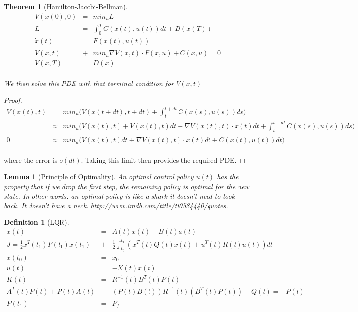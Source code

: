 \documentclass[a4paper,landscape]{article}
\theoremstyle{change}
\newtheorem{definition}[equation]{Definition}
\newtheorem{thm}[equation]{Theorem}
\newtheorem{lemma}[equation]{Lemma}
\theoremstyle{nonumberplain}
\newtheorem{proof}{Proof}
\numberwithin{equation}{section}
\begin{document}
\begin{thm}[Hamilton-Jacobi-Bellman]
\begin{eqnarray*}
V ( x(0) , 0 ) &=& min_u L\\
L &=& \int_0^T C ( x(t), u(t)) dt + D(x(T))\\
\dot{x} (t) &=& F ( x(t), u(t) )\\
\dot{V} (x ,t ) &+& min_u \nabla V(x,t) \cdot F(x,u) + C(x,u) = 0\\
V(x,T) &=& D(x)\\
\end{eqnarray*}

We then solve this PDE with that terminal condition for $V(x,t)$

\end{thm}

\begin{proof}
\begin{eqnarray*}
V(x(t),t) &=& min_u  \big( V(x(t+dt),t+dt) + \int_t^{t+dt} C(x(s),u(s)) ds \big)\\
&\approx& min_u  \big( V(x(t),t) + \dot{V}(x(t),t) dt + \nabla V ( x(t) , t) \cdot \dot{x}(t) dt + \int_t^{t+dt} C(x(s),u(s)) ds \big)\\
0 &\approx& min_u  \big( \dot{V}(x(t),t) dt + \nabla V ( x(t) , t) \cdot \dot{x}(t) dt + C(x(t),u(t)) dt \big)\\
\end{eqnarray*}

where the error is $o(dt)$. Taking this limit then provides the required PDE.

\end{proof}

\begin{lemma}[Principle of Optimality]
An optimal control policy $u(t)$ has the property that if we drop the first step, the remaining policy is optimal for the new state. In other words, an optimal policy is like a shark it doesn't need to look back. It doesn't have a neck. \url{http://www.imdb.com/title/tt0584440/quotes}.
\end{lemma}

\begin{definition}[LQR]
\begin{eqnarray*}
\dot{x}(t) &=& A (t) x(t) + B(t) u(t)\\
J = \frac{1}{2} x^T (t_1) F(t_1 ) x (t_1) &+& \frac{1}{2} \int_{t_0}^{t_1} ( x^T (t) Q (t) x (t) + u^T (t) R(t) u(t)  ) dt\\
x (t_0 ) &=& x_0\\
u(t) &=& - K(t) x(t)\\
K(t) &=& R^{-1}(t) B^T(t) P (t)\\
A^T (t) P(t) + P(t) A(t) &-& ( P(t) B(t) ) R^{-1}(t) ( B^T(t) P(t) ) + Q(t) = - \dot{P} (t)\\
P(t_1 ) &=& P_f\\
\end{eqnarray*}
\end{definition}
\end{document}

